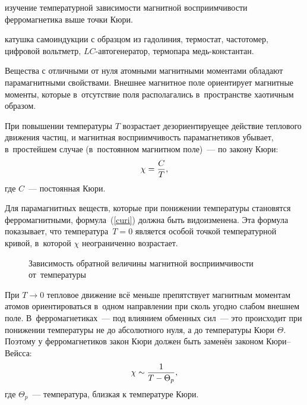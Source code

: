 
\begin{lab:aim}
	изучение температурной зависимости магнитной восприимчивости ферромагнетика выше точки Кюри.
\end{lab:aim}

\begin{lab:equipment}
	катушка самоиндукции с образцом из гадолиния, термостат, частотомер, цифровой вольтметр, $LC$-автогенератор,
	термопара медь-константан.
\end{lab:equipment}

Вещества с отличными от нуля атомными магнитными моментами обладают парамагнитными свойствами. Внешнее магнитное поле
ориентирует магнитные моменты, которые в~отсутствие поля располагались в~пространстве хаотичным образом.

При повышении температуры $T$ возрастает дезориентируещее действие теплового движения частиц, и магнитная
восприимчивость парамагнетиков убывает, в~простейшем случае (в~постоянном магнитном поле)~--- по закону Кюри:
\begin{equation}%
	\chi=\frac{C}{T},
	\eqmark{curi}
\end{equation}
где $C$~--- постоянная Кюри.

Для парамагнитных веществ, которые при понижении температуры становятся ферромагнитными, формула~(\eqref{curi}) должна быть
видоизменена. Эта формула показывает, что температура~$T=0$ является особой точкой температурной кривой, в~которой
$\chi$ неограниченно возрастает.


\begin{wrapfigure}{r}{0.4\textwidth}
	\caption{Зависимость обратной величины магнитной восприимчивости от~температуры}
\end{wrapfigure}

При $T\to 0$ тепловое движение всё меньше препятствует магнитным моментам атомов ориентироваться в~одном направлении при
сколь угодно слабом внешнем поле. В~ферромагнетиках~--- под влиянием обменных сил~--- это происходит при понижении
температуры не до абсолютного нуля, а до температуры Кюри $\Theta$. Поэтому у ферромагнетиков закон Кюри должен
быть заменён законом Кюри--Вейсса:
\begin{equation}%
	\chi\sim \frac{1}{T-\Theta_p},
	\eqmark{curi-veis}
\end{equation}
где $\Theta_p$~--- температура, близкая к температуре Кюри.

